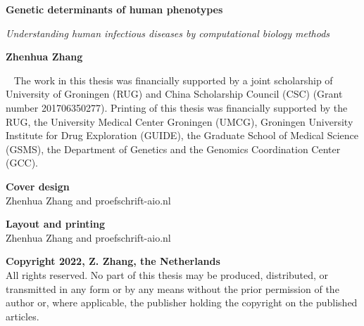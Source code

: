 \documentclass{book}
\begin{document}
\begin{titlepage}
	\centering
	{\Huge \textbf{Genetic determinants of human phenotypes}\par}
  {\LARGE \textit{Understanding human infectious diseases by computational biology methods} \par}
	\vfill
	{\LARGE \textbf{Zhenhua Zhang}\par}
\end{titlepage}

\newpage
~
\vfill
\thispagestyle{empty}
The work in this thesis was financially supported by a joint scholarship of University of Groningen (RUG) and China Scholarship Council (CSC) (Grant number 201706350277).
Printing of this thesis was financially supported by the RUG, the University Medical Center Groningen (UMCG), Groningen University Institute for Drug Exploration (GUIDE), the Graduate School of Medical Science (GSMS), the Department of Genetics and the Genomics Coordination Center (GCC). \par

\textbf{Cover design} \\ Zhenhua Zhang and proefschrift-aio.nl \par
\textbf{Layout and printing} \\ Zhenhua Zhang and proefschrift-aio.nl \par

\textbf{Copyright\textsuperscript{\textcopyright} 2022, Z. Zhang, the Netherlands} \\
All rights reserved. No part of this thesis may be produced, distributed, or transmitted in any form or by any means without the prior permission of the author or, where applicable, the publisher holding the copyright on the published articles.
\end{document}

